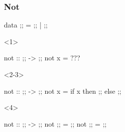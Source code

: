 \documentclass[17pt]{beamer}
\renewcommand{\(}[1]{\begin{columns}[#1]}
\renewcommand{\)}{\end{columns}}
\newcommand{\<}[1]{\begin{column}{#1}}
\renewcommand{\>}{\end{column}}
\begin{document}
\begin{frame}[fragile]
\frametitle{Not}
\begin{minipage}[t][.4\textheight]{\textwidth}
\begin{code}
    data ;; = ;; | ;;
\end{code}
\begin{onlyenv}<1>
  \begin{code}
    not :: ;; -> ;;
    not x = ???
  \end{code}
\end{onlyenv}
\begin{onlyenv}<2-3>
  \begin{code}
    not :: ;; -> ;;
    not x = if x then ;; else ;;
  \end{code}
\end{onlyenv}
\begin{onlyenv}<4>
  \begin{code}
    not :: ;; -> ;;
    not ;;  = ;;
    not ;; = ;;
  \end{code}
\end{onlyenv}
\end{minipage}
\begin{minipage}[c][.3\textheight]{\textwidth}
\begin{center}
\end{center}
\end{minipage}
\end{frame}
\end{document}
